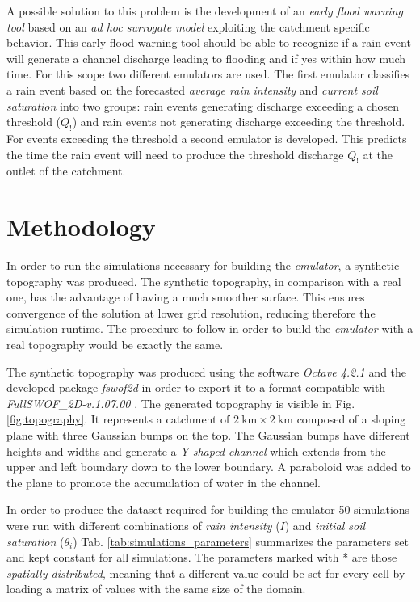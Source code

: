 A possible solution to this problem is the development of an \emph{early flood warning tool} based on an \emph{ad hoc surrogate model} exploiting the catchment specific behavior.
This early flood warning tool should be able to recognize if a rain event will generate a channel discharge leading to flooding and if yes within how much time.
For this scope two different emulators are used.
The first emulator classifies a rain event based on the forecasted \emph{average rain intensity} and \emph{current soil saturation} into two groups: rain events generating discharge exceeding a chosen threshold ($Q_!$) and rain events not generating discharge exceeding the threshold.
For events exceeding the threshold a second emulator is developed.
This predicts the time the rain event will need to produce the threshold discharge $Q_!$ at the outlet of the catchment.


\section{Methodology}

In order to run the simulations necessary for building the \textit{emulator}, a synthetic topography was produced.
The synthetic topography, in comparison with a real one, has the advantage of having a much smoother surface.
This ensures convergence of the solution at lower grid resolution, reducing therefore the simulation runtime.
The procedure to follow in order to build the \textit{emulator} with a real topography would be exactly the same.

The synthetic topography was produced using the software \textit{Octave 4.2.1}  \autocite{octave_community_gnu_2018} and the developed package \textit{fswof2d}  in order to export it to a format compatible with \textit{FullSWOF\_2D-v.1.07.00} \autocite{delestre_fullswof:_2014} .
The generated topography is visible in Fig. \ref{fig:topography}.
It represents a catchment of $\SI{2}{\kilo\meter} \times \SI{2}{\kilo\meter}$ composed of a sloping plane with three Gaussian bumps on the top.
The Gaussian bumps have different heights and widths and generate a \emph{Y-shaped channel} which extends from the upper and left boundary down to the lower boundary.
A paraboloid was added to the plane to promote the accumulation of water in the channel.

In order to produce the dataset required for building the emulator \num{50} simulations were run with different combinations of \emph{rain intensity} ($I$) and \emph{initial soil saturation} ($\theta_i$)
Tab. \ref{tab:simulations_parameters} summarizes the parameters set and kept constant for all simulations.
The parameters marked with * are those \emph{spatially distributed}, meaning that a different value could be set for every cell by loading a matrix of values with the same size of the domain.




